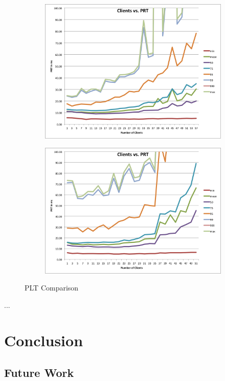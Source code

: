 \documentclass[conference]{IEEEtran}
\begin{document}
\begin{figure}[!h]
	\centering
	\begin{subfigure}[b]{0.49\columnwidth}
		\centering
		\includegraphics[width=\columnwidth]{figures/render.png}
	\end{subfigure}
	\begin{subfigure}[b]{0.49\columnwidth}
		\centering
		\includegraphics[width=\columnwidth]{figures/render_1.png}
	\end{subfigure}
	\caption{PLT Comparison}
\end{figure}




...

\section{Conclusion}\label{sec:conclusion}
\subsection*{Future Work}



\end{document}
